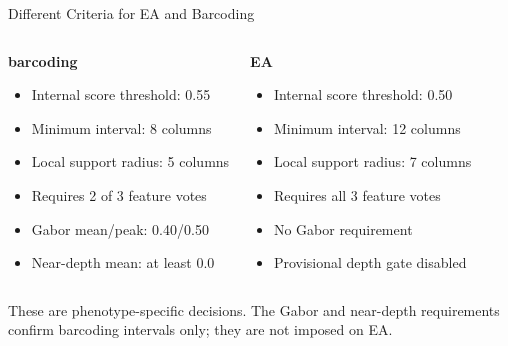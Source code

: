 \documentclass[aspectratio=169]{beamer}
\newcommand{\EA}{\textcolor{eacolor}{\textbf{EA}}}
\newcommand{\Barcode}{\textcolor{barcodecolor}{\textbf{barcoding}}}
\begin{document}
\begin{frame}{Different Criteria for EA and Barcoding}

\begin{columns}[T]
\begin{block}{\Barcode}
\begin{itemize}
    \item Internal score threshold: 0.55
    \item Minimum interval: 8 columns
    \item Local support radius: 5 columns
    \item Requires 2 of 3 feature votes
    \item Gabor mean/peak: 0.40/0.50
    \item Near-depth mean: at least 0.0
\end{itemize}
\end{block}

\begin{block}{\EA}
\begin{itemize}
    \item Internal score threshold: 0.50
    \item Minimum interval: 12 columns
    \item Local support radius: 7 columns
    \item Requires all 3 feature votes
    \item No Gabor requirement
    \item Provisional depth gate disabled
\end{itemize}
\end{block}
\end{columns}

\vspace{0.2cm}
These are phenotype-specific decisions. The Gabor and near-depth requirements
confirm barcoding intervals only; they are not imposed on EA.

\end{frame}
\end{document}
